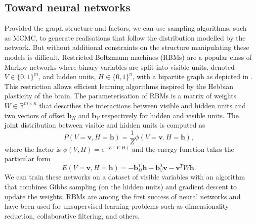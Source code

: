 \subsection{Toward neural networks}
Provided the graph structure and factors, we can use sampling algorithms, such as MCMC, to generate realisations that follow the distribution modelled by the network. But without additional constraints on the structure manipulating these models is difficult.
Restricted Boltzmann machines (RBMs) are a popular class of Markov networks where binary variables are split into visible units, denoted $V \in \{0, 1\}^m$, and hidden units, $H \in \{0, 1\}^n$, with a bipartite graph as depicted in . This restriction allows efficient learning algorithms inspired by the Hebbian plasticity of the brain. The parameterisation of RBMs is a matrix of weights $W \in \mathbb{R}^{m\times n}$ that describes the interactions between visible and hidden units and two vectors of offset $\bm{b}_H$ and $\bm{b}_V$ respectively for hidden and visible units. The joint distribution between visible and hidden units is computed as
$$ P(V=\bm{v}, H=\bm{h}) = \frac{1}{Z} \phi(V=\bm{v}, H=\bm{h}), $$
where the factor is $ \phi(V, H)=e^{-E(V, H)} $ and the energy function takes the particular form
$$ E(V=\bm{v}, H=\bm{h}) = -\bm{b}_H^T \bm{h} - \bm{b}_V^T \bm{v} - \bm{v}^T W \bm{h}.  $$
We can train these networks on a dataset of visible variables with an algorithm that combines Gibbs sampling (on the hidden units) and gradient descent to update the weights. RBMs are among the first success of neural networks and have been used for unsupervised learning problems such as dimensionality reduction, collaborative filtering, and others.
%
%
%


